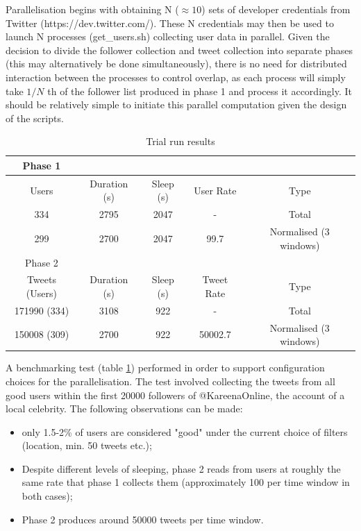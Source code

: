 Parallelisation begins with obtaining N ($\approx 10$) sets of developer credentials from Twitter (https://dev.twitter.com/). These N credentials may then be used to launch N processes (get\_users.sh) collecting user data in parallel. Given the decision to divide the follower collection and tweet collection into separate phases (this may alternatively be done simultaneously), there is no need for distributed interaction between the processes to control overlap, as each process will simply take $1/N$ th of the follower list produced in phase 1 and process it accordingly. It should be relatively simple to initiate this parallel computation given the design of the scripts.

\begin{table}
\begin{center}
\begin{tabular}{ | c | c | c | c | c | }
\hline
Phase 1  \\ \hline
Users & Duration (s) & Sleep (s) & User Rate & Type \\ \hline
334 & 2795 & 2047 & - & Total \\ \hline
299 & 2700 & 2047 & 99.7 & Normalised (3 windows) \\ \hline
Phase 2 \\ \hline
Tweets (Users) & Duration (s) & Sleep (s) & Tweet Rate & Type \\ \hline
171990 (334) & 3108 & 922 & - & Total \\ \hline
150008 (309) & 2700 & 922 & 50002.7 &  Normalised (3 windows) \\ \hline
\end{tabular}
\end{center}
\caption{Trial run results}
\label{table:benchmark}
\end{table}

A benchmarking test (table \ref{table:benchmark}) performed in order to support configuration choices for the parallelisation. The test involved collecting the tweets from all good users within the first 20000 followers of @KareenaOnline, the account of a local celebrity. The following observations can be made:

\begin{itemize}
\item only 1.5-2\% of users are considered "good" under the current choice of filters (location, min. 50 tweets etc.);
\item Despite different levels of sleeping, phase 2 reads from users at roughly the same rate that phase 1 collects them (approximately 100 per time window in both cases);
\item Phase 2 produces around 50000 tweets per time window.
\end{itemize}

